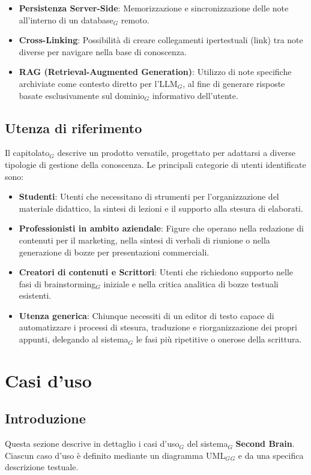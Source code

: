 \documentclass[a4paper, 10pt]{article}
\begin{document}
\begin{itemize}
    \item \textbf{Persistenza Server-Side}: Memorizzazione e sincronizzazione delle note all'interno di un database$_G$ remoto.
    \item \textbf{Cross-Linking}: Possibilità di creare collegamenti ipertestuali (link) tra note diverse per navigare nella base di conoscenza.
    \item \textbf{RAG (Retrieval-Augmented Generation)}: Utilizzo di note specifiche archiviate come contesto diretto per l'LLM$_G$, al fine di generare risposte basate esclusivamente sul dominio$_G$ informativo dell'utente.
\end{itemize}

\subsection{Utenza di riferimento}
Il capitolato$_G$ descrive un prodotto versatile, progettato per adattarsi a diverse tipologie di gestione della conoscenza. Le principali categorie di utenti identificate sono:

\begin{itemize}
    \item \textbf{Studenti}: Utenti che necessitano di strumenti per l'organizzazione del materiale didattico, la sintesi di lezioni e il supporto alla stesura di elaborati.
    \item \textbf{Professionisti in ambito aziendale}: Figure che operano nella redazione di contenuti per il marketing, nella sintesi di verbali di riunione o nella generazione di bozze per presentazioni commerciali.
    \item \textbf{Creatori di contenuti e Scrittori}: Utenti che richiedono supporto nelle fasi di brainstorming$_G$ iniziale e nella critica analitica di bozze testuali esistenti.
    \item \textbf{Utenza generica}: Chiunque necessiti di un editor di testo capace di automatizzare i processi di stesura, traduzione e riorganizzazione dei propri appunti, delegando al sistema$_G$ le fasi più ripetitive o onerose della scrittura.
\end{itemize}
\newpage

\newpage

\section{Casi d'uso}
\subsection{Introduzione}
Questa sezione descrive in dettaglio i casi d'uso$_G$ del sistema$_G$ \textbf{Second Brain}. Ciascun caso d'uso è definito mediante un diagramma UML$_G$$_{G}$ e da una specifica descrizione testuale. 
\end{document}
